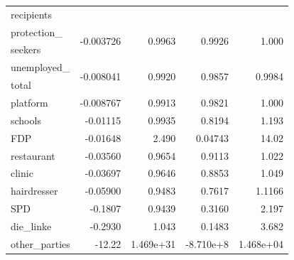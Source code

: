 \begin{table}[H]
\begin{tabular}{l r r r r}
recipients \\
protection\_ & \multirow{2}{*}{-0.003726} & \multirow{2}{*}{0.9963}  & \multirow{2}{*}{0.9926} & \multirow{2}{*}{1.000}\\
seekers \\
unemployed\_ & \multirow{2}{*}{-0.008041} & \multirow{2}{*}{0.9920}  & \multirow{2}{*}{0.9857} & \multirow{2}{*}{0.9984} \\
total \\
platform & -0.008767  & 0.9913 &  0.9821 & 1.000 \\
schools & -0.01115  & 0.9935 & 0.8194 & 1.193 \\
FDP & -0.01648  & 2.490 & 0.04743 & 14.02\\
restaurant & -0.03560  & 0.9654 & 0.9113 & 1.022 \\
clinic & -0.03697  & 0.9646 &  0.8853 & 1.049 \\
hairdresser & -0.05900  & 0.9483 & 0.7617 & 1.1166 \\
SPD & -0.1807  & 0.9439 & 0.3160 & 2.197 \\
die\_linke & -0.2930  & 1.043 &  0.1483 & 3.682 \\
other\_parties & -12.22  & 1.469e+31 & -8.710e+8 & 1.468e+04\\
\bottomrule
\end{tabular}
\end{table}